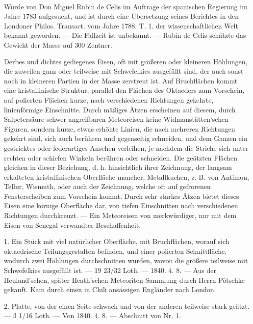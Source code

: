 \documentclass[a4paper, 11pt, oneside, polutonikogreek, german]{article}
\begin{document}
\paragraph{}
Wurde von Don Miguel Rubin de Celis im Auftrage der spanischen Regierung im Jahre 1783 aufgesucht, und ist durch eine Übersetzung seines Berichtes in den Londoner Philos. Transact. vom Jahre 1788. T. 1. der wissenschaftlichen Welt bekannt geworden. — Die Fallzeit ist unbekannt. — Rubin de Celis schätzte das Gewicht der Masse auf 300 Zentner.

Derbes und dichtes gediegenes Eisen, oft mit größeren oder kleineren Höhlungen, die zuweilen ganz oder teilweise mit Schwefelkies ausgefüllt sind, der auch sonst noch in kleineren Partien in der Masse zerstreut ist. Auf Bruchflächen kommt eine kristallinische Struktur, parallel den Flächen des Oktaeders zum Vorschein, auf polierten Flächen kurze, nach verschiedenen Richtungen gekehrte, linienförmige Einschnitte. Durch mäßiges Ätzen erscheinen auf diesem, durch Salpetersäure schwer angreifbaren Meteoreisen keine Widmanstätten‘schen Figuren, sondern kurze, etwas erhöhte Linien, die nach mehreren Richtungen gekehrt sind, sich auch berühren und gegenseitig schneiden, und dem Ganzen ein gestricktes oder federartiges Ansehen verleihen, je nachdem die Striche sich unter rechten oder schiefen Winkeln berühren oder schneiden. Die geätzten Flächen gleichen in dieser Beziehung, d. h. hinsichtlich ihrer Zeichnung, der langsam erkalteten kristallinischen Oberfläche mancher, Metallkuchen, z. B. von Antimon, Tellur, Wismuth, oder auch der Zeichnung, welche oft auf gefrorenen Fensterscheiben zum Vorschein kommt. Durch sehr starkes Ätzen bietet dieses Eisen eine körnige Oberfläche dar, von tiefen Einschnitten nach verschiedenen Richtungen durchkreuzt. — Ein Meteoreisen von merkwürdiger, nur mit dem Eisen von Senegal verwandter Beschaffenheit.

1. Ein Stück mit viel natürlicher Oberfläche, mit Bruchflächen, worauf sich oktaedrische Teilungsgestalten befinden, und einer polierten Schnittfläche, wodurch zwei Höhlungen durchschnitten wurden, wovon die größere teilweise mit Schwefelkies ausgefüllt ist. — 19 23/32 Loth. — 1840. 4. 8. — Aus der Heuland'schen, später Heath'schen Meteoriten-Sammlung durch Herrn Pötschke gekauft. Kam durch einen in Chili ansässigen Engländer nach London.

2. Platte, von der einen Seite schwach und von der anderen teilweise stark geätzt. — 3 1/16 Loth. — Von 1840. 4. 8. — Abschnitt von Nr. 1.
\end{document}
